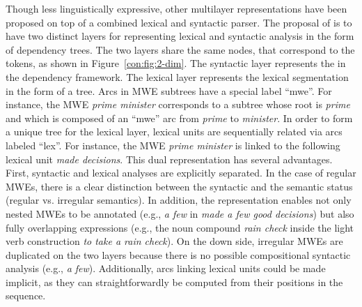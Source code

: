 \documentclass[output=paper]{langsci/langscibook}
\begin{document}
Though less linguistically expressive, other multilayer representations have been proposed on top of a combined lexical and syntactic parser. The proposal of \citet{constant16deep} is to have two distinct layers for representing lexical and syntactic analysis in the form of dependency trees. The two layers share the same nodes, that correspond to the tokens, as shown in Figure~\ref{con:fig:2-dim}. 
The syntactic layer represents the  in the dependency framework. The lexical layer represents the lexical segmentation in the form of a tree. 
Arcs in MWE subtrees have a special label ``mwe''. For instance, the MWE \textit{prime minister} corresponds to a subtree whose root is \textit{prime} and which is composed of an ``mwe'' arc from \textit{prime} to \textit{minister}.  In order to form a unique tree for the lexical layer, lexical units are sequentially related via arcs labeled ``lex''. For instance, the MWE \textit{prime minister} is linked to the following lexical unit \textit{made decisions}. 
This dual representation has several advantages. First, syntactic and lexical analyses are explicitly separated. In the case of regular MWEs, there is a clear distinction between the syntactic and the semantic status (regular  vs. irregular semantics). In addition, the representation enables not only nested MWEs to be annotated (e.g.,  \textit{a few} in \textit{made a few good decisions}) but also fully overlapping expressions (e.g., the noun compound \textit{rain check} inside the light verb construction \textit{to take a rain check}). 
On the down side, irregular MWEs are duplicated on the two layers because there is no possible compositional syntactic analysis (e.g., \textit{a few}). Additionally, arcs linking lexical units could be made implicit, as they can straightforwardly be computed from their positions in the sequence.
\end{document}
